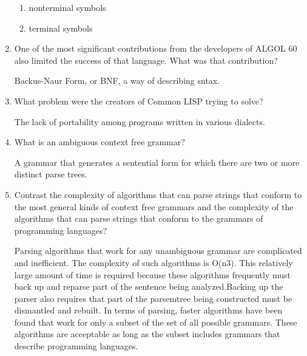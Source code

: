 \begin{enumerate}
\begin{answer}
  \begin{enumerate}
    \item nonterminal symbols
    \item terminal symbols
    \end{enumerate}

    \end{answer}


  \item One of the most significant contributions from the developers
    of ALGOL 60 also limited the success of that language. What was
    that contribution?

  \begin{answer}

    Backus-Naur Form, or BNF, a way of describing sntax.

    \end{answer}

  \item What problem were the creators of Common LISP trying to solve?

  \begin{answer}

    The lack of portability among programs written in various dialects.

    \end{answer}

  \item What is an ambiguous context free grammar?

  \begin{answer}

    A grammar that generates a sentential form for which there are two or more distinct parse trees.

    \end{answer}

  \item Contrast the complexity of algorithms that can parse strings
    that conform to the most general kinds of context free grammars
    and the complexity of the algorithms that can parse strings that
    conform to the grammars of programming languages?

  \begin{answer}

    Parsing algorithms that work for any unambiguous grammar are complicated
and inefficient. The complexity of such algorithms is O(n3). This relatively large amount of time is required because these algorithms frequently must back up and reparse part of the sentence being analyzed.Backing up the parser also requires that part of the parsemtree being constructed must be dismantled and rebuilt.
	In terms of parsing, faster algorithms have been found that work for only a subset of the set of all possible grammars. These algorithms are acceptable as long as the subset includes grammars that describe programming languages.


\end{answer}
\end{enumerate}
